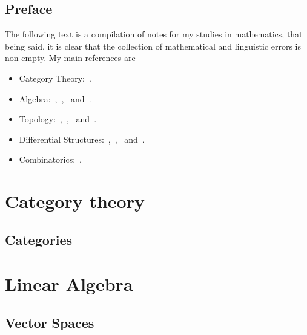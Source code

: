 


\frontmatter

\maketitle
\tableofcontents
\listoftodos

\chapter{Preface}

The following text is a compilation of notes for my studies in mathematics, that
being said, it is clear that the collection of mathematical and linguistic
errors is non-empty. My main references are
\begin{itemize}\setlength\itemsep{0em}
\item Category Theory:~\cite{Rie16}.
\item Algebra:~\cite{Yu89},~\cite{Kim20},~\cite{Aluf09} and~\cite{Lang93}.
\item Topology:~\cite{Lee11},~\cite{Tai20},~\cite{Mun00} and~\cite{Eng89}.
\item Differential Structures:~\cite{Zor15},~\cite{Zor16},~\cite{Rud76}
  and~\cite{Jost06}.
\item Combinatorics:~\cite{Die16}.
\end{itemize}

\mainmatter

\part{Category theory}

\chapter{Categories}






\part{Linear Algebra}

\chapter{Vector Spaces}










